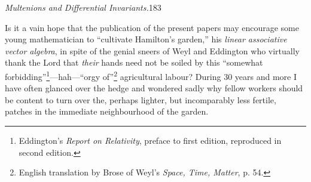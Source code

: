\documentclass[11pt]{article}
\begin{document}
\newpage\thispagestyle{empty}\begin{center}\textit{Multenions and Differential Invariants.}\hfill 183\end{center}
{\renewcommand\thefootnote{\fnsymbol{footnote}}\setcounter{footnote}{0}
\indent Is it a vain hope that the publication of the present papers may encourage some young mathematician to ``cultivate Hamilton's garden,'' his \emph{linear associative vector algebra}, in spite of the genial sneers of Weyl and Eddington who virtually thank the Lord that \emph{their} hands need not be soiled by this ``somewhat forbidding''\footnote{Eddington's \emph{Report on Relativity}, preface to first edition, reproduced in second edition.}---hah---``orgy of''\footnote{English translation by Brose of Weyl's \emph{Space, Time, Matter}, p. 54.} agricultural labour? During 30 years and more I have often glanced over the hedge and wondered sadly why fellow workers should be content to turn over the, perhaps lighter, but incomparably less fertile, patches in the immediate neighbourhood of the garden.}
\end{document}
